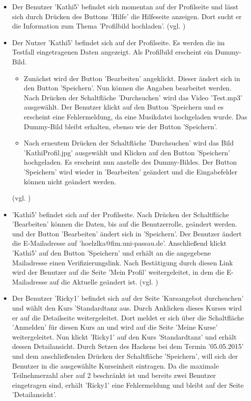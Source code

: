 \documentclass[a4paper]{scrreprt}
\begin{document}
\begin{itemize}
				\item {}
				Der Benutzer 'Kathi5' befindet sich momentan auf der Profilseite und lässt sich durch Drücken des Buttons 'Hilfe' die Hilfeseite anzeigen. Dort sucht er die Information zum Thema 'Profilbild hochladen'. (vgl. )
					
				\item {}
				Der Nutzer 'Kathi5' befindet sich auf der Profilseite. Es werden die im Testfall  eingetragenen Daten angezeigt. Als Profilbild erscheint ein Dummy-Bild. 
					\begin{itemize}
						\item Zunächst wird der Button 'Bearbeiten' angeklickt. Dieser ändert sich in den Button 'Speichern'. Nun können die Angaben bearbeitet werden. Nach Drücken der Schaltfläche 'Durchsuchen' wird das Video 'Test.mp3' ausgewählt. Der Benutzer klickt auf den Button 'Speichern und es erscheint eine Fehlermeldung, da eine Musikdatei hochgeladen wurde. Das Dummy-Bild bleibt erhalten, ebenso wie der Button 'Speichern'.
						\item Nach erneutem Drücken der Schaltfläche 'Durchsuchen' wird das Bild 'KathiProfil.jpg' ausgewählt und Klicken auf den Button 'Speichern' hochgeladen. Es erscheint nun anstelle des Dummy-Bildes.	Der Button 'Speichern' wird wieder in 'Bearbeiten' geändert und die Eingabefelder können nicht geändert werden.	
					\end{itemize}
				(vgl. )
									
				\item {}
				'Kathi5' befindet sich auf der Profilseite. Nach Drücken der Schaltfläche 'Bearbeiten' können die Daten, bis auf die Benutzerrolle, geändert werden. und der Button 'Bearbeiten' ändert sich in 'Speichern'. Der Benutzer ändert die E-Mailadresse auf 'hoelzlka@fim.uni-passau.de'. Anschließend klickt 'Kathi5' auf den Button 'Speichern' und erhält an die angegebene Mailadresse einen Verifizierungslink. Nach Bestätigung durch diesen Link wird der Benutzer auf die Seite 'Mein Profil' weitergeleitet, in dem die E-Mailadresse auf die Aktuelle geändert ist. (vgl. )
				
				\item {}
				Der Benutzer 'Ricky1' befindet sich auf der Seite 'Kursangebot durchsuchen' und wählt den Kurs 'Standardtanz aus. Durch Anklicken dieses Kurses wird er auf die Detailseite weitergeleitet. Dort meldet er sich über die Schaltfläche 'Anmelden' für diesen Kurs an und wird auf die Seite 'Meine Kurse' weitergeleitet. Nun klickt 'Ricky1' auf den Kurs 'Standardtanz' und erhält dessen Detailansicht. Durch Setzen des Hackens bei dem Termin '05.05.2015' und dem anschließenden Drücken der Schaltfläche 'Speichern', will sich der Benutzer in die ausgewählte Kurseinheit eintragen. Da die maximale Teilnehmerzahl aber auf 2 beschränkt ist und bereits zwei Benutzer eingetragen sind, erhält 'Ricky1' eine Fehlermeldung und bleibt auf der Seite 'Detailansicht'.
				

\end{itemize}
\end{document}
